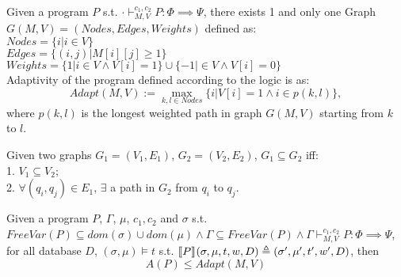 \documentclass[a4paper,11pt]{article}
\begin{document}
\begin{defn}
[Adapt]
Given a program $P$ s.t. $\cdot \vdash_{M,V}^{c_1, c_2} P: \Phi \implies \Psi$, there exists 1 and only one Graph $G(M, V) = (Nodes, Edges, Weights)$ defined as:
\\
$Nodes = \{i | i \in V\}$
\\
$Edges = \{ (i, j) | M[i][j] \geq 1 \}$
\\
$ Weights = \{ 1 | i \in V \land V[i] = 1\}
        \cup \{ -1 | \in V \land V[i] = 0\}$
\\
Adaptivity of the program defined according to the logic is as:
\[
Adapt(M, V) := \max_{k, l \in Nodes}\{i | V[i] = 1 \land i \in p(k, l) \},
\]
where $p(k, l)$ is the longest weighted path in graph $G(M, V)$ starting from $k$ to $l$.
\end{defn}
%
%
\begin{defn}
[Subgraph]
Given two graphs $G_1 = (V_1, E_1)$, $G_2 = (V_2, E_2)$, $G_1 \subseteq G_2$ iff:
\\
1. $V_1 \subseteq V_2$;
\\
2. $\forall (q_i, q_j) \in E_1$, $\exists $ a path in $G_2$ from $q_i$ to $q_j$.
\end{defn}
%
%
\begin{thm}
[Soundness]
Given a program $P$, $\Gamma$, $\mu$, $c_1, c_2$ and $\sigma$ s.t. $
FreeVar(P) \subseteq dom(\sigma) \cup dom(\mu)  
\land \Gamma \subseteq FreeVar(P) 
\land \Gamma \vdash_{M,V}^{c_1,c_2} P: \Phi \implies \Psi$,
 for all database $D$, $(\sigma, \mu) \vDash t$ s.t. 
$\llbracket P \rrbracket_{} (\sigma, \mu , t ,w , D)  \triangleq  (\sigma' , \mu' , t', w' , D)$,
then
\[
A(P) \leq Adapt(M, V)
\]
\end{thm}
\end{document}
